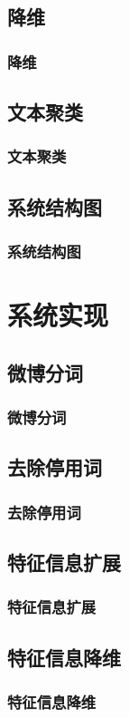 \documentclass[CJKutf8, table]{beamer}
\begin{document}
\begin{CJK}{UTF8}{gbsn}
\subsection{降维}
\begin{frame}
  \frametitle{降维}
\end{frame}

\subsection{文本聚类}
\begin{frame}
  \frametitle{文本聚类}
\end{frame}

\subsection{系统结构图}
\begin{frame}
  \frametitle{系统结构图}
\end{frame}

\section{系统实现}

\subsection{微博分词}
\begin{frame}
  \frametitle{微博分词}
\end{frame}

\subsection{去除停用词}
\begin{frame}
  \frametitle{去除停用词}
\end{frame}

\subsection{特征信息扩展}
\begin{frame}
  \frametitle{特征信息扩展}
\end{frame}

\subsection{特征信息降维}
\begin{frame}
  \frametitle{特征信息降维}
\end{frame}


\end{CJK}
\end{document}
